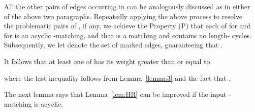 \documentclass[11pt,twoside]{article}\usepackage{amssymb,latexsym,graphicx,hyperref}\usepackage{epstopdf}
\newenvironment{proof}{{\sc Proof. }}{\hfill\vspace{0.2in}}
\begin{document}
\begin{proof}
All the other pairs of edges occurring in  can be analogously discussed as in either of the above two paragraphs.
Repeatedly applying the above process to resolve the problematic pairs of , if any,
we achieve the Property (P) that each of  for  and  for  is an acyclic -matching,
and that  is a matching and  contains no length- cycles.
Subsequently, we let  denote the set of marked edges, guaranteeing that .


It follows that at least one of  has its weight greater than or equal to

where the last inequality follows from Lemma~\ref{lemma3} and the fact that .
\end{proof}


The next lemma says that Lemma~\ref{lem:HR} can be improved if the input -matching is acyclic. 
\end{document}
